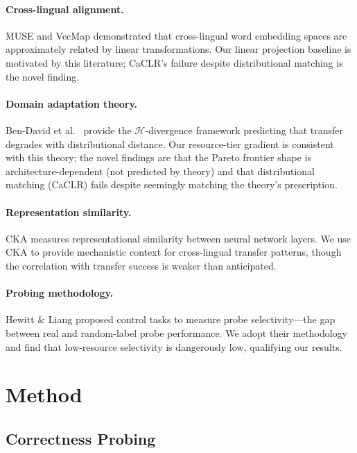 \documentclass[11pt,a4paper]{article}
\begin{document}
\paragraph{Cross-lingual alignment.}
MUSE \cite{conneau2018muse} and VecMap \cite{artetxe2018vecmap} demonstrated that cross-lingual word embedding spaces are approximately related by linear transformations. Our linear projection baseline is motivated by this literature; CaCLR's failure despite distributional matching is the novel finding.

\paragraph{Domain adaptation theory.}
Ben-David et al.\ \cite{bendavid2010theory} provide the $\mathcal{H}$-divergence framework predicting that transfer degrades with distributional distance. Our resource-tier gradient is consistent with this theory; the novel findings are that the Pareto frontier shape is architecture-dependent (not predicted by theory) and that distributional matching (CaCLR) fails despite seemingly matching the theory's prescription.

\paragraph{Representation similarity.}
CKA \cite{kornblith2019similarity} measures representational similarity between neural network layers. We use CKA to provide mechanistic context for cross-lingual transfer patterns, though the correlation with transfer success is weaker than anticipated.

\paragraph{Probing methodology.}
Hewitt \& Liang \cite{hewitt2019control} proposed control tasks to measure probe selectivity---the gap between real and random-label probe performance. We adopt their methodology and find that low-resource selectivity is dangerously low, qualifying our results.

\section{Method}
\label{sec:method}

\subsection{Correctness Probing}
\end{document}
